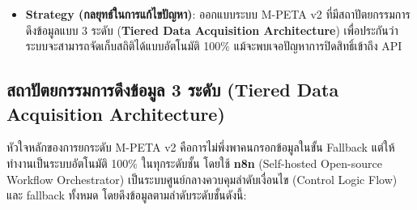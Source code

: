 \documentclass[10pt,a4paper]{article}
\begin{document}
\begin{itemize}
\begin{enumerate}[label=\alph*)]
      \item ขาดการวิเคราะห์เปรียบเทียบข้ามช่องทาง (Cross-platform Comparison) ทำให้การปรับเปลี่ยนทิศทางใช้ดุลยพินิจและความรู้สึกเป็นหลัก
      \item คอนเทนต์บางชิ้นเริ่มกลายเป็นกระแสไวรัล (Viral Content) แต่ชมรมไม่สามารถรับทราบได้เร็วพอที่จะกดสนับสนุน (Boost Ads) เพื่อเปิดรับผู้รับชมวงกว้างได้ทันเวลา
    \end{enumerate}
  \item \textbf{Strategy (กลยุทธ์ในการแก้ไขปัญหา)}: ออกแบบระบบ M-PETA v2 ที่มีสถาปัตยกรรมการดึงข้อมูลแบบ 3 ระดับ (\textbf{Tiered Data Acquisition Architecture}) เพื่อประกันว่าระบบจะสามารถจัดเก็บสถิติได้แบบอัตโนมัติ 100\% แม้จะพบเจอปัญหาการปิดสิทธิ์เข้าถึง API
\end{itemize}

\subsection{สถาปัตยกรรมการดึงข้อมูล 3 ระดับ (Tiered Data Acquisition Architecture)}
หัวใจหลักของการยกระดับ M-PETA v2 คือการไม่พึ่งพาคนกรอกข้อมูลในขั้น Fallback แต่ให้ทำงานเป็นระบบอัตโนมัติ 100\% ในทุกระดับชั้น โดยใช้ \textbf{n8n} (Self-hosted Open-source Workflow Orchestrator) เป็นระบบศูนย์กลางควบคุมลำดับเงื่อนไข (Control Logic Flow) และ fallback ทั้งหมด โดยดึงข้อมูลตามลำดับระดับชั้นดังนี้:
\end{document}
